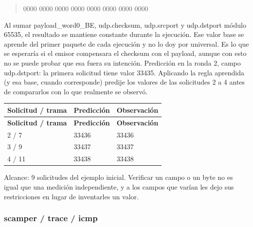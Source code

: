 \begin{quote}\ttfamily\footnotesize\raggedright 0000 0000 0000 0000 0000 0000 0000 0000\end{quote}



Al sumar payload\_word0\_BE, udp.checksum, udp.srcport y udp.dstport módulo 65535, el resultado se mantiene constante durante la ejecución. Ese valor base se aprende del primer paquete de cada ejecución y no lo doy por universal. Es lo que se esperaría si el emisor compensara el checksum con el payload, aunque con esto no se puede probar que esa fuera su intención. 
Predicción en la ronda 2, campo udp.dstport: la primera solicitud tiene valor 33435. Aplicando la regla aprendida (y esa base, cuando corresponde) predije los valores de las solicitudes 2 a 4 antes de compararlos con lo que realmente se observó.


\begingroup
\fontsize{9}{11}\selectfont
\addtocounter{table}{-1}
\begin{longtable}{p{3.2cm}p{5.1cm}p{5.1cm}}
\toprule
\textbf{Solicitud / trama} & \textbf{Predicción} & \textbf{Observación} \\ \midrule
\endfirsthead
\toprule
\textbf{Solicitud / trama} & \textbf{Predicción} & \textbf{Observación} \\ \midrule
\endhead
2 / 7 & 33436 & 33436 \\
3 / 9 & 33437 & 33437 \\
4 / 11 & 33438 & 33438 \\
\bottomrule
\end{longtable}
\endgroup
Alcance: 9 solicitudes del ejemplo inicial. Verificar un campo o un byte no es igual que una medición independiente, y a los campos que varían les dejo sus restricciones en lugar de inventarles un valor. 


\subsubsection{scamper / trace / icmp}

